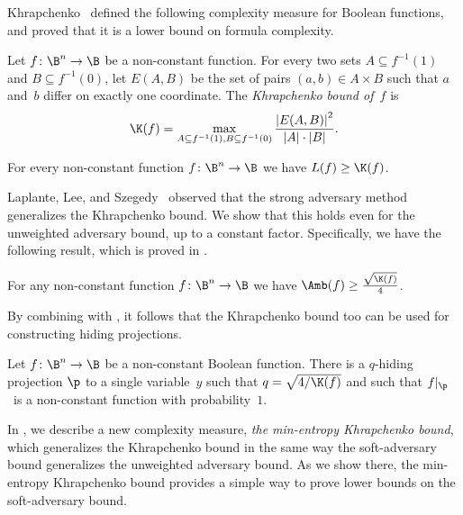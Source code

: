 \documentclass{toc}
\begin{document}
Khrapchenko~\cite{K72} defined the following complexity measure
for Boolean functions, and proved that it is a lower bound on formula
complexity. 
\begin{definition}
\label{def:khrapchenko}Let $f\colon\B^{n}\to\B$ be a non-constant function.
For every two sets $A\subseteq f^{-1}(1)$ and $B\subseteq f^{-1}(0)$,
let $E(A,B)$ be the set of pairs $(a,b)\in A\times B$ such that
$a$ and~$b$ differ on exactly one coordinate. The \emph{Khrapchenko
bound of~$f$} is 
\[
\K(f)=\max_{A\subseteq f^{-1}(1),B\subseteq f^{-1}(0)}\frac{\left|E(A,B)\right|^{2}}{\left|A\right|\cdot\left|B\right|}.
\]
\end{definition}

\begin{theorem}[\cite{K72}]
\label{thm:khrapchenko-formula-size}For every non-constant function
$f\colon\B^{n}\to\B$ we have $L(f)\ge\K(f)$.
\end{theorem}

Laplante, Lee, and Szegedy~\cite{LLS06} observed that the strong
adversary method generalizes the Khrapchenko bound. We show that this
holds even for the unweighted adversary bound, up to a constant factor.
Specifically, we have the following result, which is proved in .
\begin{proposition}
\label{prop:K-Amb}For any non-constant function $f\colon\B^{n}\to\B$
we have $\Amb(f)\geq\frac{\sqrt{\K(f)}}{4}$.
\end{proposition}

By combining  
with , it follows
that the Khrapchenko bound too can be used for constructing hiding
projections.
\begin{corollary}
\label{cor:khrapchenko-hiding}Let $f\colon\B^{n}\to\B$ be a non-constant
Boolean function. There is a $q$-hiding projection $\p$ to a single
variable~$y$ such that $q=\sqrt{4/\K(f)}$ and such that $f|_{\p}$~is
a non-constant function with probability~$1$.
\end{corollary}

In , we describe a new complexity measure,
\emph{the min-entropy Khrapchenko bound}, which generalizes the Khrapchenko
bound in the same way the soft-adversary bound generalizes the unweighted
adversary bound. As we show there, the min-entropy Khrapchenko bound
provides a simple way to prove lower bounds on the soft-adversary
bound.
\end{document}
